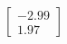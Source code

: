 \documentclass[preview]{standalone}
\begin{document}
\begin{align*}
\begin{bmatrix} -2.99 \\ 1.97 \end{bmatrix}
\end{align*}
\end{document}
